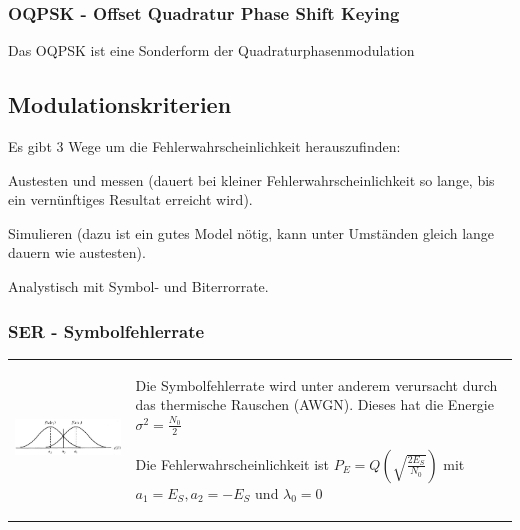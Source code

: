 \subsubsection{OQPSK - Offset Quadratur Phase Shift Keying }
Das OQPSK ist eine Sonderform der Quadraturphasenmodulation
	
	
\subsection{Modulationskriterien}
Es gibt 3 Wege um die Fehlerwahrscheinlichkeit
herauszufinden:
\begin{liste}
	\item Austesten und messen (dauert bei kleiner Fehlerwahrscheinlichkeit so
	lange, bis ein vernünftiges Resultat erreicht wird).
	\item Simulieren (dazu ist ein gutes Model nötig, kann unter Umständen gleich
	lange dauern wie austesten).
	\item Analystisch mit Symbol- und Biterrorrate.
\end{liste}
\subsubsection{SER - Symbolfehlerrate }
\begin{tabular}{ll}
\parbox{8cm}{
    \includegraphics[width=8cm]{./bilder/modulation_AWGN.jpg}
    }
& \parbox{9cm}{
	Die Symbolfehlerrate wird unter anderem verursacht durch das thermische
	Rauschen (AWGN). Dieses hat die Energie\\ 
	$\sigma^2=\frac{N_0}{2}$ \\
	\\
	Die Fehlerwahrscheinlichkeit ist $P_E=Q(\sqrt{\frac{2 E_S}{N_0}})$ mit $a_1 =
	E_S, a_2 = -E_S$ und $\lambda_0 = 0$\\
    }
\end{tabular}

